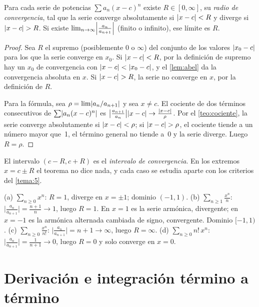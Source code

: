 \begin{teorema}\label{teo:radio}
Para cada serie de potencias $\sum a_n(x-c)^{n}$ existe $R\in[0,\infty]$, su \emph{radio de convergencia}, tal que la serie converge absolutamente si $\lvert x-c\rvert<R$ y diverge si $\lvert x-c\rvert>R$. Si existe $\lim_{n\to\infty}\Bigl|\frac{a_n}{a_{n+1}}\Bigr|$ (finito o infinito), ese límite es $R$.
\end{teorema}

\begin{proof}
Sea $R$ el supremo (posiblemente $0$ o $\infty$) del conjunto de los valores $\lvert x_0-c\rvert$ para los que la serie converge en $x_0$. Si $\lvert x-c\rvert<R$, por la definición de supremo hay un $x_0$ de convergencia con $\lvert x-c\rvert<\lvert x_0-c\rvert$, y el \cref{lem:abel} da la convergencia absoluta en $x$. Si $\lvert x-c\rvert>R$, la serie no converge en $x$, por la definición de $R$.

Para la fórmula, sea $\rho=\lim\lvert a_n/a_{n+1}\rvert$ y sea $x\neq c$. El cociente de dos términos consecutivos de $\sum\lvert a_n(x-c)^{n}\rvert$ es $\bigl|\frac{a_{n+1}}{a_n}\bigr|\lvert x-c\rvert\to\frac{\lvert x-c\rvert}{\rho}$. Por el \cref{teo:cociente}, la serie converge absolutamente si $\lvert x-c\rvert<\rho$; si $\lvert x-c\rvert>\rho$, el cociente tiende a un número mayor que~1, el término general no tiende a~$0$ y la serie diverge. Luego $R=\rho$.
\end{proof}

El intervalo $(c-R,c+R)$ es el \emph{intervalo de convergencia}. En los extremos $x=c\pm R$ el teorema no dice nada, y cada caso se estudia aparte con los criterios del \cref{tema:5}.

\begin{ejemplo}\label{ej:radios}
(a) $\sum_{n\ge0}x^{n}$: $R=1$, diverge en $x=\pm1$; dominio $(-1,1)$.
(b) $\sum_{n\ge1}\frac{x^{n}}{n}$: $\bigl|\frac{a_n}{a_{n+1}}\bigr|=\frac{n+1}{n}\to1$, luego $R=1$. En $x=1$ es la serie armónica, divergente; en $x=-1$ es la armónica alternada cambiada de signo, convergente. Dominio $[-1,1)$.
(c) $\sum_{n\ge0}\frac{x^{n}}{n!}$: $\bigl|\frac{a_n}{a_{n+1}}\bigr|=n+1\to\infty$, luego $R=\infty$.
(d) $\sum_{n\ge0}n!\,x^{n}$: $\bigl|\frac{a_n}{a_{n+1}}\bigr|=\frac{1}{n+1}\to0$, luego $R=0$ y solo converge en $x=0$.
\end{ejemplo}

\section{Derivación e integración término a término}

